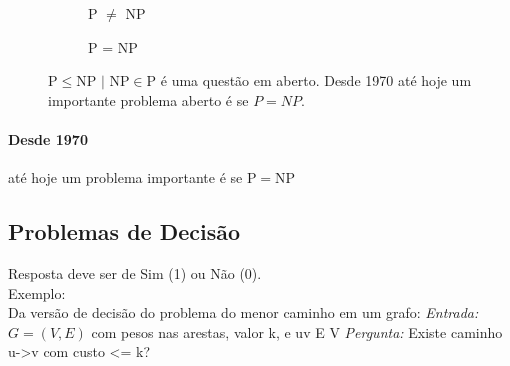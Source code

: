 \documentclass[a4paper,oneside,article,table]{article}
\begin{document}
\begin{figure}
    \begin{subfigure}{0.5\textwidth}
        \caption{P $\neq$ NP}
    \end{subfigure}
    \begin{subfigure}{0.5\textwidth}
        \caption{P = NP}
    \end{subfigure}
    \caption*{$\textrm{P} \leq \textrm{NP | NP} \in \textrm{P}$ é uma questão em aberto. Desde 1970 até hoje um importante problema aberto é se $P=NP$.}
\end{figure}

\paragraph{Desde 1970} até hoje um problema importante é se P$=$NP


\subsection{Problemas de Decisão}

Resposta deve ser de Sim (1) ou Não (0).\\
Exemplo:\\
Da versão de decisão do problema do menor caminho em um grafo:
\textit{Entrada:} $G= (V,E)$ com pesos nas arestas, valor k, e uv E V
\textit{Pergunta:} Existe caminho u->v com custo <= k?\\
\end{document}
